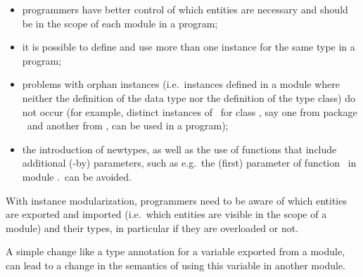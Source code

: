 \begin{itemize}

  \item programmers have better control of which entities are
    necessary and should be in the scope of each module in a program;

  \item it is possible to define and use more than one instance for
    the same type in a program;

  \item problems with orphan instances (i.e.~instances defined in a
    module where neither the definition of the data type nor the
    definition of the type class) do not occur (for example, distinct
    instances of \Either\ for class \Monad, say one from package
    \mtl\ and another from \transformers, can be used in a program);

  \item the introduction of newtypes, as well as the use of functions
    that include additional (-by) parameters, such as e.g.~the (first)
    parameter of function \sortBy\ in module \Data.\List\ can be
    avoided.

\end{itemize}

With instance modularization, programmers need to be aware of which
entities are exported and imported (i.e.~which entities are visible in
the scope of a module) and their types, in particular if they are
overloaded or not.

A simple change like a type annotation for a variable exported from a
module, can lead to a change in the semantics of using this variable
in another module.






